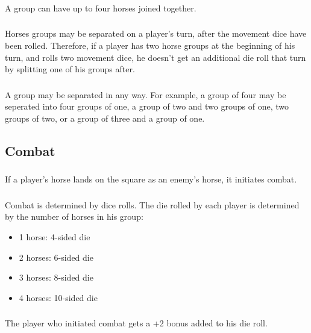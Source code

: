 \documentclass[12pt]{article} %
\begin{document}
\subsubsection{}
A group can have up to four horses joined together.

\subsubsection{}
Horses groups may be separated on a player's turn, after the movement dice have been rolled.  Therefore, if a player has two horse groups at the beginning of his turn, and rolls two movement dice, he doesn't get an additional die roll that turn by splitting one of his groups after.  

\subsubsection{}
A group may be separated in any way.  For example, a group of four may be seperated into four groups of one, a group of two and two groups of one, two groups of two, or a group of three and a group of one.


\subsection{Combat}

\subsubsection{}
If a player's horse lands on the square as an enemy's horse, it initiates combat.  

\subsubsection{}
Combat is determined by dice rolls.  The die rolled by each player is determined by the number of horses in his group:
\begin{itemize}
	\item 1 horse:  4-sided die
	\item 2 horses: 6-sided die
	\item 3 horses: 8-sided die
	\item 4 horses: 10-sided die	
\end{itemize}

\subsubsection{}
The player who initiated combat gets a +2 bonus added to his die roll.
\end{document}
